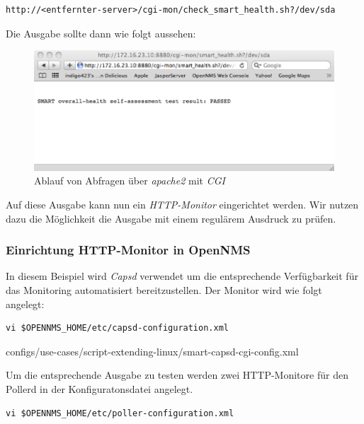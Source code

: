 \begin{lstlisting}[numbers=none]
http://<entfernter-server>/cgi-mon/check_smart_health.sh?/dev/sda
\end{lstlisting}

Die Ausgabe sollte dann wie folgt aussehen:

\begin{figure}[H]
	\centering
	\includegraphics[width=1.0\textwidth]{images/use-cases/script-extending-linux/result-apache2-cgi}
	\caption{Ablauf von Abfragen über \emph{apache2} mit \emph{CGI}}
	\label{pic:flow-cgi}
\end{figure}

Auf diese Ausgabe kann nun ein \emph{HTTP-Monitor} eingerichtet werden. Wir nutzen dazu die Möglichkeit die Ausgabe mit einem regulärem Ausdruck zu prüfen.

\subsubsection{Einrichtung HTTP-Monitor in OpenNMS}
In diesem Beispiel wird \emph{Capsd} verwendet um die entsprechende Verfügbarkeit für das Monitoring automatisiert bereitzustellen. Der Monitor wird wie folgt angelegt:

\begin{lstlisting}[numbers=none]
vi $OPENNMS_HOME/etc/capsd-configuration.xml
\end{lstlisting}


  {configs/use-cases/script-extending-linux/smart-capsd-cgi-config.xml}

Um die entsprechende Ausgabe zu testen werden zwei HTTP-Monitore für den Pollerd in der Konfiguratonsdatei angelegt.

\begin{lstlisting}[numbers=none]
vi $OPENNMS_HOME/etc/poller-configuration.xml
\end{lstlisting}

